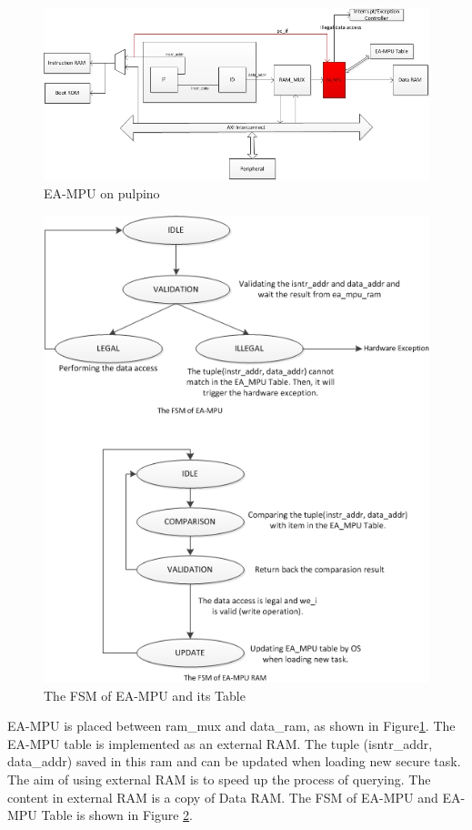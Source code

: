 \documentclass[a4paper]{article}
\begin{document}
\begin{figure}
	\centering
	\includegraphics[scale=0.6]{ea_mpu.jpg}
	\caption{EA-MPU on pulpino}
	\label{fig:ea_mpu}
\end{figure}

\begin{figure}
	\centering
	\includegraphics[scale=0.6]{fsm.jpg}
	\caption{The FSM of EA-MPU and its Table}
	\label{fig:ea_mpu_fsm}
\end{figure}


EA-MPU is placed between ram\_mux and data\_ram, as shown in Figure\ref{fig:ea_mpu}. The EA-MPU table is implemented as an external RAM. The tuple (isntr\_addr, data\_addr) saved in this ram and can be updated when loading new secure task. The aim of using external RAM is to speed up the process of querying. The content in external RAM is a copy of Data RAM. The FSM of EA-MPU and EA-MPU Table is shown in Figure \ref{fig:ea_mpu_fsm}. 
\end{document}
